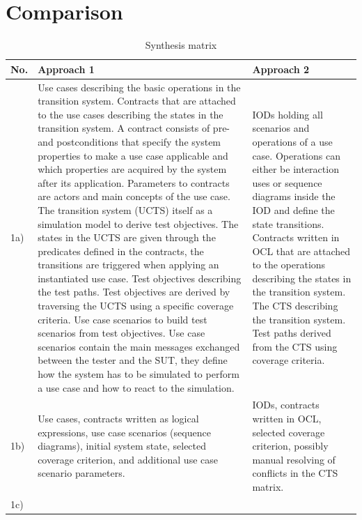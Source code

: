 \newpage
\section{Comparison} \label{comparison}
\begin{small}
\begin{longtable}[h]{p{0.45cm}|p{}|p{}}
	\caption{Synthesis matrix}
	\label{tab3:synthesismatrix}
	\\    %
	\hline
	\textbf{No.} & \textbf{Approach 1} & \textbf{Approach 2} \\
	\hline
	1a) & 
	Use cases describing the basic operations in the transition system. Contracts that are attached to the use cases describing the states in the transition system. A contract consists of pre- and postconditions that specify the system properties to make a use case applicable and which properties are acquired by the system after its application. Parameters to contracts are actors and main concepts of the use case. The transition system (UCTS) itself as a simulation model to derive test objectives. The states in the UCTS are given through the predicates defined in the contracts, the transitions are triggered when applying an instantiated use case. Test objectives describing the test paths. Test objectives are derived by traversing the UCTS using a specific coverage criteria. Use case scenarios to build test scenarios from test objectives. Use case scenarios contain the main messages exchanged between the tester and the SUT, they define how the system has to be simulated to perform a use case and how to react to the simulation. & 
	IODs holding all scenarios and operations of a use case. Operations can either be interaction uses or sequence diagrams inside the IOD and define the state transitions. Contracts written in OCL that are attached to the operations describing the states in the transition system. The CTS describing the transition system. Test paths derived from the CTS using coverage criteria.  \\
	\hline
	1b) & 
	Use cases, contracts written as logical expressions, use case scenarios (sequence diagrams), initial system state, selected coverage criterion, and additional use case scenario parameters. & 
	IODs, contracts written in OCL, selected coverage criterion, possibly manual resolving of conflicts in the CTS matrix. \\
	\hline
	1c) &

\end{longtable}
\end{small}
